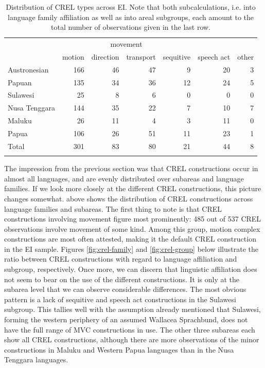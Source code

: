 \begin{table}
\begin{tabular}{lrrrr|rr}
  \lsptoprule
& \multicolumn{4}{c}{movement} & & \\
 & {motion} & {direction} & {transport} & {sequitive} & {speech act} & {other}\\  
  \midrule
  Austronesian & 166 & 46 & 47 & 9 & 20 & 3 \tabularnewline
  Papuan & 135 & 34 &  36 &  12 & 24 & 5 \tabularnewline
   \midrule
  Sulawesi & 25 & 8 & 6 & 0 & 0 & 0 \tabularnewline
  Nusa Tenggara & 144 & 35 & 22 & 7 & 10 & 7 \tabularnewline
  Maluku & 26 & 11 & 4 & 3 & 11 & 0 \tabularnewline 
  Papua & 106 & 26 & 51 & 11 & 23 & 1 \tabularnewline 
\midrule
Total & 301 & 83 & 80 & 21 & 44 & 8 \tabularnewline
\lspbottomrule
\end{tabular}
\caption[Distribution of CREL types]{Distribution of CREL types across EI. Note that both subcalculations, i.e. into language family affiliation as well as into areal subgroups, each amount to the total number of observations given in the last row.}
\label{table:CREL_overview}
\end{table}

The impression from the previous section was that CREL constructions occur in almost all languages, and are evenly distributed over subareas and language families. If we look more closely at the different CREL constructions, this picture changes somewhat.  above shows the distribution of CREL constructions across language families and subareas. The first thing to note is that CREL constructions involving movement figure most prominently: 485 out of 537 CREL observations involve movement of some kind. Among this group, motion complex constructions are most often attested, making it the default CREL construction in the EI sample. Figures \ref{fig:crel-family} and \ref{fig:crel-group} below illustrate the ratio between CREL constructions with regard to language affiliation and subgroup, respectively. Once more, we can discern that linguistic affiliation does not seem to bear on the use of the different constructions. It is only at the subarea level that we can observe considerable differences. The most obvious pattern is a lack of sequitive and speech act constructions in the Sulawesi subgroup. This tallies well with the assumption already mentioned that Sulawesi, forming the western periphery of an assumed Wallacea Sprachbund, does not have the full range of MVC constructions in use. The other three subareas each show all CREL constructions, although there are more observations of the minor constructions in Maluku and Western Papua languages than in the Nusa Tenggara languages.

